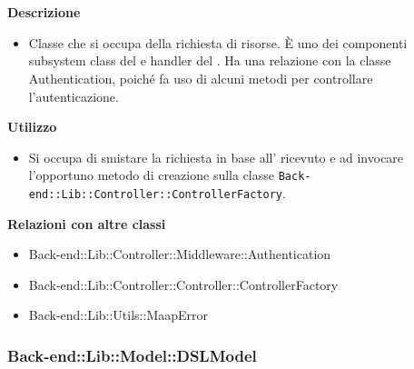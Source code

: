 				\textbf{\\ \\ Descrizione} 
					\begin{itemize}
						\item[] Classe che si occupa della richiesta di risorse. È uno dei componenti subsystem class del   e handler del  . Ha una relazione con la classe Authentication, poiché fa uso di alcuni metodi per controllare l'autenticazione.
					\end{itemize}      
				\textbf{Utilizzo}  
					\begin{itemize}
						\item[] Si occupa di smistare la richiesta in base all' ricevuto e ad invocare l'opportuno metodo di creazione sulla classe \texttt{Back-end::Lib::Controller::ControllerFactory}.
					\end{itemize}
					\textbf{Relazioni con altre classi}
					\begin{itemize}
							\item{Back-end::Lib::Controller::Middleware::Authentication}
							\item{Back-end::Lib::Controller::Controller::ControllerFactory}
							\item{Back-end::Lib::Utils::MaapError}
					\end{itemize}
	\subsubsection{Back-end::Lib::Model::DSLModel}
